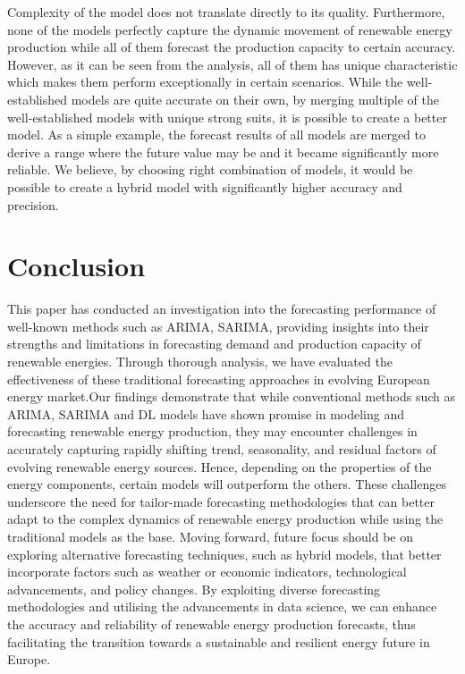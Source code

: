 \documentclass[acmtog]{acmart}
\begin{document}
Complexity of the model does not translate directly to its quality. Furthermore, none of the models perfectly capture the dynamic movement of renewable energy production while all of them forecast the production capacity to certain accuracy. However, as it can be seen from the analysis, all of them has unique characteristic which makes them perform exceptionally in certain scenarios. While the well-established models are quite accurate on their own, by merging multiple of the well-established models with unique strong suits, it is possible to create a better model. As a simple example, the forecast results of all models are merged to derive a range where the future value may be and it became significantly more reliable. We believe, by choosing right combination of models, it would be possible to create a hybrid model with significantly higher accuracy and precision.

\section{Conclusion}

This paper has conducted an investigation into the forecasting performance of well-known methods such as ARIMA, SARIMA, providing insights into their strengths and limitations in forecasting demand and production capacity of renewable energies. Through thorough analysis, we have evaluated the effectiveness of these traditional forecasting approaches in evolving European energy market.Our findings demonstrate that while conventional methods such as ARIMA, SARIMA and DL models have shown promise in modeling and forecasting renewable energy production, they may encounter challenges in accurately capturing rapidly shifting trend, seasonality, and residual factors of evolving renewable energy sources. Hence, depending on the properties of the energy components, certain models will outperform the others. These challenges underscore the need for tailor-made forecasting methodologies that can better adapt to the complex dynamics of renewable energy production while using the traditional models as the base.
Moving forward, future focus should be on exploring alternative forecasting techniques, such as hybrid models, that better incorporate factors such as weather or economic indicators, technological advancements, and policy changes. By exploiting diverse forecasting methodologies and utilising the advancements in data science, we can enhance the accuracy and reliability of renewable energy production forecasts, thus facilitating the transition towards a sustainable and resilient energy future in Europe.




\end{document}
